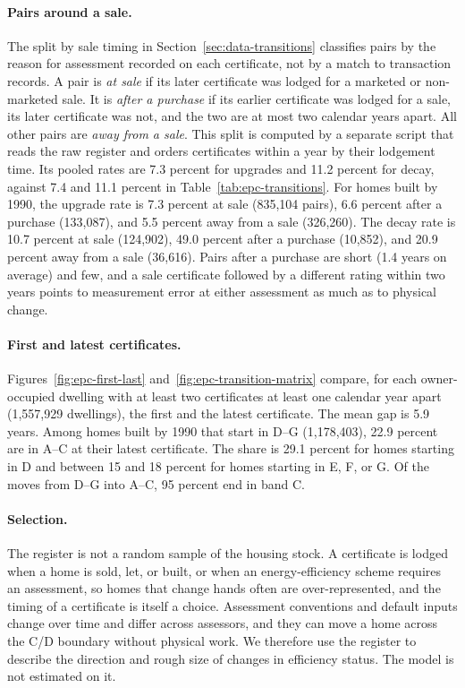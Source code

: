 \paragraph{Pairs around a sale.} The split by sale timing in
Section~\ref{sec:data-transitions} classifies pairs by the reason for
assessment recorded on each certificate, not by a match to transaction
records. A pair is \emph{at sale} if its later certificate was lodged for a
marketed or non-marketed sale. It is \emph{after a purchase} if its earlier
certificate was lodged for a sale, its later certificate was not, and the
two are at most two calendar years apart. All other pairs are \emph{away
from a sale}. This split is computed by a separate script that reads the
raw register and orders certificates within a year by their lodgement
time. Its pooled rates are 7.3 percent for upgrades and 11.2 percent for
decay, against 7.4 and 11.1 percent in Table~\ref{tab:epc-transitions}. For
homes built by 1990, the upgrade rate is 7.3 percent at sale (835,104
pairs), 6.6 percent after a purchase (133,087), and 5.5 percent away from a
sale (326,260). The decay rate is 10.7 percent at sale (124,902), 49.0
percent after a purchase (10,852), and 20.9 percent away from a sale
(36,616). Pairs after a purchase are short (1.4 years on average) and
few, and a sale certificate followed by a different rating within two
years points to measurement error at either assessment as much as to
physical change.

\paragraph{First and latest certificates.}
Figures~\ref{fig:epc-first-last} and~\ref{fig:epc-transition-matrix}
compare, for each owner-occupied dwelling with at least two certificates
at least one calendar year apart (1,557,929 dwellings), the first and the
latest certificate. The mean gap is 5.9 years. Among homes built by 1990
that start in D--G (1,178,403), 22.9 percent are in A--C at their latest
certificate. The share is 29.1 percent for homes starting in D and between
15 and 18 percent for homes starting in E, F, or G. Of the moves from D--G
into A--C, 95 percent end in band C.

\paragraph{Selection.} The register is not a random sample of the housing
stock. A certificate is lodged when a home is sold, let, or built, or when
an energy-efficiency scheme requires an assessment, so homes that change
hands often are over-represented, and the timing of a certificate is
itself a choice. Assessment conventions and default inputs change over
time and differ across assessors, and they can move a home across the C/D
boundary without physical work. We therefore use the register to describe
the direction and rough size of changes in efficiency status. The model is
not estimated on it.


